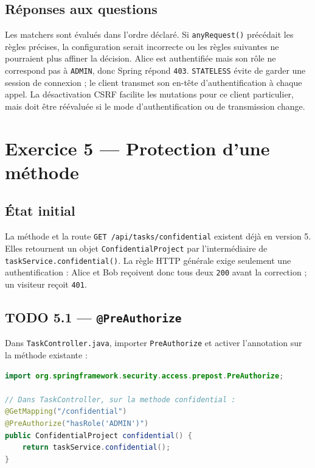 \documentclass[11pt,a4paper]{article}
\begin{document}
\subsection{Réponses aux questions}

Les matchers sont évalués dans l’ordre déclaré. Si \texttt{anyRequest()} précédait les règles précises, la configuration serait incorrecte ou les règles suivantes ne pourraient plus affiner la décision. Alice est authentifiée mais son rôle ne correspond pas à \texttt{ADMIN}, donc Spring répond \texttt{403}. \texttt{STATELESS} évite de garder une session de connexion ; le client transmet son en-tête d’authentification à chaque appel. La désactivation CSRF facilite les mutations pour ce client particulier, mais doit être réévaluée si le mode d’authentification ou de transmission change.

\section{Exercice 5 — Protection d’une méthode}

\subsection{État initial}

La méthode et la route \texttt{GET /api/tasks/confidential} existent déjà en version 5. Elles retournent un objet \texttt{ConfidentialProject} par l’intermédiaire de \texttt{taskService.confidential()}. La règle HTTP générale exige seulement une authentification : Alice et Bob reçoivent donc tous deux \texttt{200} avant la correction ; un visiteur reçoit \texttt{401}.

\subsection{TODO 5.1 — \texttt{@PreAuthorize}}

Dans \texttt{TaskController.java}, importer \texttt{PreAuthorize} et activer l’annotation sur la méthode existante :

\begin{lstlisting}[language=Java]
import org.springframework.security.access.prepost.PreAuthorize;

// Dans TaskController, sur la methode confidential :
@GetMapping("/confidential")
@PreAuthorize("hasRole('ADMIN')")
public ConfidentialProject confidential() {
    return taskService.confidential();
}
\end{lstlisting}
\end{document}
